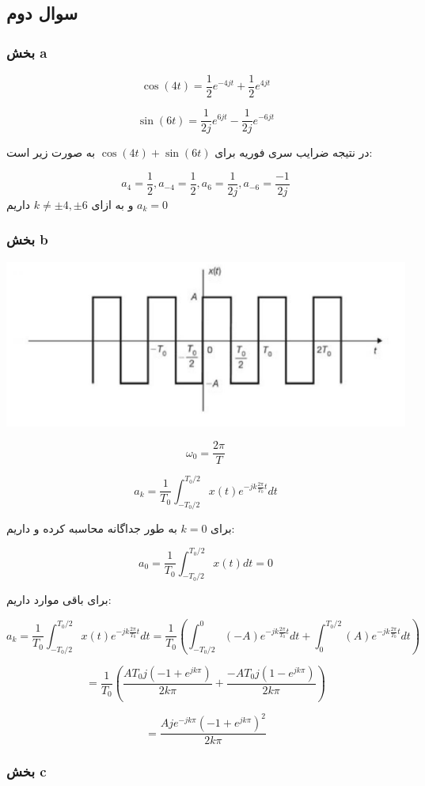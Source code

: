 \documentclass[12pt]{article}
\begin{document}
\newpage
\subsection{سوال دوم}
\subsubsection{بخش a}

$$\cos(4t) = \frac{1}{2} e^{-4 j t}+\frac{1}{2} e^{4 j t} $$

$$\sin(6t) = \frac{1}{2j} e^{6 j t}-\frac{1}{2j} e^{-6 j t} $$

در نتیجه ضرایب سری فوریه برای 
$\cos(4t)+\sin(6t)$
به صورت زیر است:

$$a_4 = \frac{1}{2} , a_{-4} = \frac{1}{2} , a_{6} = \frac{1}{2 j} , a_{-6} = \frac{-1}{2j}$$
و به ازای $k\neq \pm4,\pm6$ داریم $a_k = 0$

\subsubsection{بخش b}
\begin{center}
	\includegraphics[width = 0.5 \textwidth]{images/3.png}
\end{center}


$$\omega_0 = \frac{2\pi}{T}$$

$$a_k = \frac{1}{T_0} \int_{-T_0/2}^{T_0/2} x(t) e^{-j k \frac{2\pi}{T_0} t} dt$$

برای $k=0$ به طور جداگانه محاسبه کرده و داریم:

$$\boxed{a_0 = \frac{1}{T_0} \int_{-T_0/2}^{T_0/2} x(t) dt = 0}$$

برای باقی موارد داریم:

$$a_k = \frac{1}{T_0} \int_{-T_0/2}^{T_0/2} x(t) e^{-j k \frac{2\pi}{T_0} t} dt = \frac{1}{T_0}(\int_{-T_0/2}^{0} (-A) e^{-j k \frac{2\pi}{T_0} t} dt + \int_{0}^{T_0/2} (A) e^{-j k \frac{2\pi}{T_0} t} dt )$$

$$= \frac{1}{T_0} (\frac{A T_0 j (-1 + e^{j k \pi})}{2 k \pi} + \frac{- A  T_0 j (1 - e^{j k \pi})}{2 k \pi})$$

$$\boxed{= \frac{A j e^{-j k \pi} (-1 + e^{j k \pi})^2}{2 k \pi}}$$


\subsubsection{بخش c}
\end{document}
